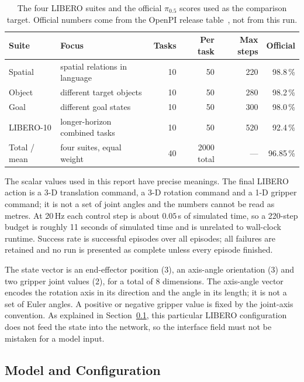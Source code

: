 \begin{table}[H]
  \centering
  \small
  \caption{The four LIBERO suites and the official $\pi_{0.5}$ scores used as
  the comparison target. Official numbers come from the OpenPI release
  table~\cite{pi05_2025}, not from this run.}
  \label{tab:pi05-suites}
  \begin{tabular}{@{}llrrrr@{}}
    \toprule
    Suite & Focus & Tasks & Per task & Max steps & Official \\
    \midrule
    Spatial   & spatial relations in language   & 10 & 50 & 220 & 98.8\,\% \\
    Object    & different target objects        & 10 & 50 & 280 & 98.2\,\% \\
    Goal      & different goal states           & 10 & 50 & 300 & 98.0\,\% \\
    LIBERO-10 & longer-horizon combined tasks   & 10 & 50 & 520 & 92.4\,\% \\
    \midrule
    Total / mean & four suites, equal weight    & 40 & 2000 total & --- & 96.85\,\% \\
    \bottomrule
  \end{tabular}
\end{table}

The scalar values used in this report have precise meanings. The final LIBERO
action is a 3-D translation command, a 3-D rotation command and a 1-D gripper
command; it is not a set of joint angles and the numbers cannot be read as
metres. At 20\,Hz each control step is about $0.05$\,s of simulated time, so a
220-step budget is roughly 11 seconds of simulated time and is unrelated to
wall-clock runtime. Success rate is successful episodes over all episodes; all
failures are retained and no run is presented as complete unless every episode
finished.

The state vector is an end-effector position (3), an axis-angle orientation (3)
and two gripper joint values (2), for a total of 8 dimensions. The axis-angle
vector encodes the rotation axis in its direction and the angle in its length;
it is not a set of Euler angles. A positive or negative gripper value is fixed
by the joint-axis convention. As explained in Section~\ref{sec:pi05-model},
this particular LIBERO configuration does not feed the state into the network,
so the interface field must not be mistaken for a model input.

\subsection{Model and Configuration}
\label{sec:pi05-model}

